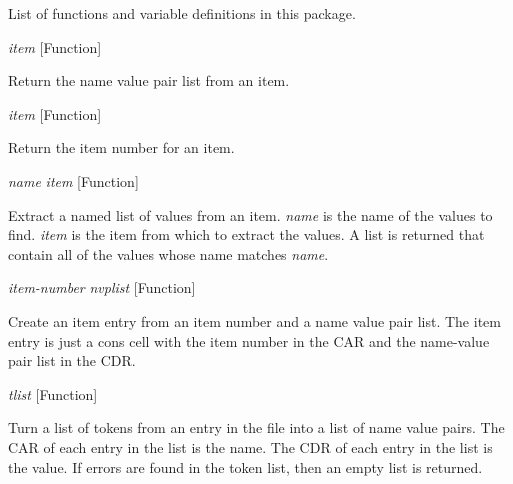 List of functions and variable definitions in this package.



\vspace{1em}
\noindent
{}
\usebox{\funcname}\emph{item}
 \hfill [Function]

\begin{doc-string}
Return the name value pair list from an item.
\end{doc-string}

\vspace{1em}
\noindent
{}
\usebox{\funcname}\emph{item}
 \hfill [Function]

\begin{doc-string}
Return the item number for an item.
\end{doc-string}

\vspace{1em}
\noindent
{}
\usebox{\funcname}\emph{name} \emph{item}
 \hfill [Function]

\begin{doc-string}
Extract a named list of values from an item.  \emph{name} is the name of the values to
find.  \emph{item} is the item from which to extract the values.  A list is returned that contain
all of the values whose name matches \emph{name}.
\end{doc-string}

\vspace{1em}
\noindent
{}
\usebox{\funcname}\emph{item-number} \emph{nvplist}
 \hfill [Function]

\begin{doc-string}
Create an item entry from an item number and a name value pair list.
The item entry is just a cons cell with the item number in the CAR and the
name-value pair list in the CDR.
\end{doc-string}

\vspace{1em}
\noindent
{}
\usebox{\funcname}\emph{tlist}
 \hfill [Function]

\begin{doc-string}
Turn a list of tokens from an entry in the file into a list of name value pairs.  The
CAR of each entry in the list is the name.  The CDR of each entry in the list is the value.  If
errors are found in the token list, then an empty list is returned.
\end{doc-string}

